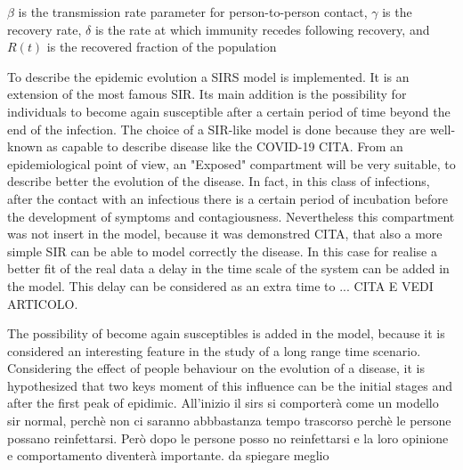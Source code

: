$\beta$ is the transmission rate parameter for person-to-person
contact, $\gamma$ is the recovery rate, $\delta$ is the rate at which
immunity recedes following recovery, and $R(t)$ is the recovered
fraction of the population

To describe the epidemic evolution a  SIRS model is implemented. It is an extension of the most famous SIR. Its main addition is the possibility for individuals to become again susceptible after a certain period of time beyond the end of the infection. The choice of a SIR-like model is done because they are well-known as capable to describe disease like the COVID-19 CITA. From an epidemiological point of view, an "Exposed" compartment will be very suitable, to describe better the evolution of the disease. In fact, in this class of infections, after the contact with an infectious there is a certain period of incubation before the development of symptoms and contagiousness. Nevertheless this compartment was not insert in the model, because it was demonstred CITA, that also a more simple SIR can be able to model correctly the disease. In this case for realise a better fit of the real data a delay in the time scale of the system can be added in the model. This delay can be considered as an extra time to ... CITA E VEDI ARTICOLO.

The possibility of become again susceptibles is added in the model, because it is considered an interesting feature in the study of a long range time scenario. 
Considering the effect of people behaviour on the evolution of a disease, it is hypothesized that two keys moment of this influence can be the initial stages and after the first peak of epidimic. 
All'inizio il sirs si comporterà come un modello sir normal, perchè non ci saranno abbbastanza tempo trascorso perchè le persone possano reinfettarsi. Però dopo le persone posso no reinfettarsi e la loro opinione e comportamento diventerà importante. da spiegare meglio

